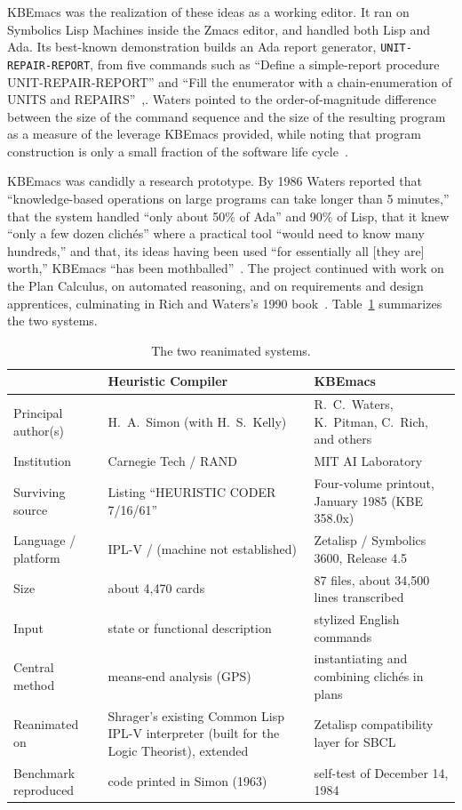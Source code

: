 \documentclass[11pt]{article}
\begin{document}
KBEmacs was the realization of these ideas as a working editor. It ran
on Symbolics Lisp Machines inside the Zmacs editor, and handled both
Lisp and Ada. Its best-known demonstration builds an Ada report
generator, \texttt{UNIT-REPAIR-REPORT}, from five commands such as
``Define a simple-report procedure UNIT-REPAIR-REPORT'' and ``Fill the
enumerator with a chain-enumeration of UNITS and
REPAIRS''~\cite[p.~48]{waters1986aimag},\cite{waters1985tse}. Waters
pointed to the order-of-magnitude difference between the size of the
command sequence and the size of the resulting program as a measure of
the leverage KBEmacs provided, while noting that program construction
is only a small fraction of the software life
cycle~\cite[p.~48]{waters1986aimag}.

KBEmacs was candidly a research prototype. By 1986 Waters reported that
``knowledge-based operations on large programs can take longer than 5
minutes,'' that the system handled ``only about 50\% of Ada'' and 90\%
of Lisp, that it knew ``only a few dozen clich\'es'' where a practical
tool ``would need to know many hundreds,'' and that, its ideas having
been used ``for essentially all [they are] worth,'' KBEmacs ``has been
mothballed''~\cite[pp.~54--55]{waters1986aimag}. The project continued
with work on the Plan Calculus, on automated reasoning, and on
requirements and design apprentices, culminating in Rich and Waters's
1990 book~\cite{richwaters1990book}.
Table~\ref{tab:systems} summarizes the two systems.

\begin{table}[H]
\centering
\caption{The two reanimated systems.}
\label{tab:systems}
\footnotesize
\begin{tabular}{@{}p{}p{}p{}@{}}
\toprule
 & \textbf{Heuristic Compiler} & \textbf{KBEmacs} \\ \midrule
Principal author(s) & H.~A.~Simon (with H.~S.~Kelly) & R.~C.~Waters, K.~Pitman, C.~Rich, and others \\
Institution & Carnegie Tech / RAND & MIT AI Laboratory \\
Surviving source & Listing ``HEURISTIC CODER 7/16/61'' & Four-volume printout, January 1985 (KBE 358.0x) \\
Language / platform & IPL-V / (machine not established) & Zetalisp / Symbolics 3600, Release 4.5 \\
Size & about 4,470 cards & 87 files, about 34,500 lines transcribed \\
Input & state or functional description & stylized English commands \\
Central method & means-end analysis (GPS) & instantiating and combining clich\'es in plans \\
Reanimated on & Shrager's existing Common Lisp IPL-V interpreter (built for the Logic Theorist), extended & Zetalisp compatibility layer for SBCL \\
Benchmark reproduced & code printed in Simon (1963) & self-test of December 14, 1984 \\ \bottomrule
\end{tabular}
\end{table}
\end{document}
